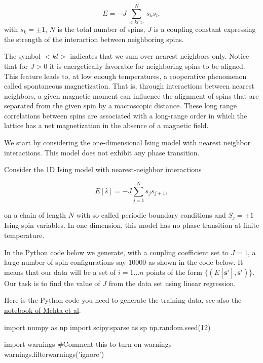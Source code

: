 \documentclass[%
oneside,                 %
final,                   %
10pt]{article}
\begin{document}
\begin{equation*}
  E=-J\sum_{<kl>}^{N}s_ks_l,
\end{equation*}
with  $s_k=\pm 1$, $N$ is the total number of spins,
$J$ is a coupling constant expressing the strength of the interaction
between neighboring spins.

The symbol $<kl>$ indicates that we sum over nearest
neighbors only.
Notice that for $J>0$ it is energetically favorable for neighboring spins
to be aligned. This feature leads to, at low enough temperatures,
a cooperative phenomenon called spontaneous magnetization. That is,
through interactions between nearest neighbors, a given magnetic
moment can influence the alignment of spins  that are separated
from the given spin by a macroscopic distance. These long range correlations
between spins are associated with a long-range order in which
the lattice has a net magnetization in the absence of a magnetic field.



We start by considering the one-dimensional Ising model with nearest neighbor interactions. This model does not exhibit any phase transition.

Consider the 1D Ising model with nearest-neighbor interactions 

\begin{equation*}
  E[\hat{s}]=-J\sum_{j=1}^{N}s_{j}s_{j+1},
\end{equation*}

on a chain of length $N$ with so-called periodic boundary conditions and $S_j=\pm 1$ Ising spin variables.
In one dimension, this model has no phase transition at finite temperature.

In the Python code below we generate, with a coupling coefficient set to $J=1$, a large number of spin configurations say $10000$ as shown in the code below.
It means that our data will be a set of $i=1\ldots n$ points of the form
$\{(E[\boldsymbol{s}^i],\boldsymbol{s}^i)\}$.
Our task is to find the value of $J$ from the data set using linear regression.

Here is the Python code you need to generate the training data, see
also the \href{{https://physics.bu.edu/~pankajm/ML-Notebooks/HTML/NB_CVI-linreg_ising.html}}{notebook of Mehta et
al}.

\bpycod
import numpy as np
import scipy.sparse as sp
np.random.seed(12)

import warnings
#Comment this to turn on warnings
warnings.filterwarnings('ignore')
\end{document}
